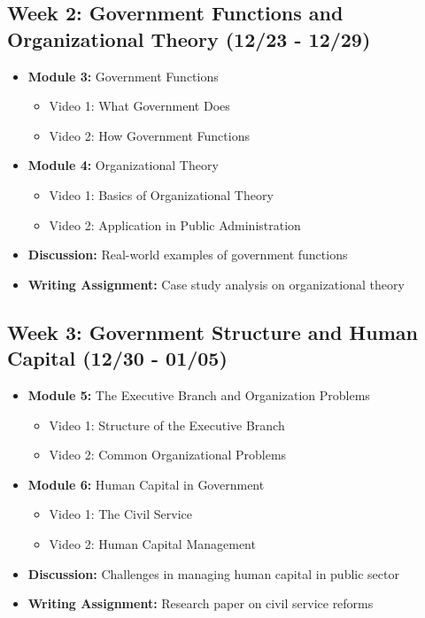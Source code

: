 \documentclass[12pt, letterpaper]{article}
\begin{document}
\subsection*{Week 2: Government Functions and Organizational Theory (12/23 - 12/29)}
\begin{itemize}
    \item \textbf{Module 3:} Government Functions
        \begin{itemize}
            \item Video 1: What Government Does
            \item Video 2: How Government Functions
        \end{itemize}
    \item \textbf{Module 4:} Organizational Theory
        \begin{itemize}
            \item Video 1: Basics of Organizational Theory
            \item Video 2: Application in Public Administration
        \end{itemize}
    \item \textbf{Discussion:} Real-world examples of government functions
    \item \textbf{Writing Assignment:} Case study analysis on organizational theory
\end{itemize}

\subsection*{Week 3: Government Structure and Human Capital (12/30 - 01/05)}
\begin{itemize}
    \item \textbf{Module 5:} The Executive Branch and Organization Problems
        \begin{itemize}
            \item Video 1: Structure of the Executive Branch
            \item Video 2: Common Organizational Problems
        \end{itemize}
    \item \textbf{Module 6:} Human Capital in Government
        \begin{itemize}
            \item Video 1: The Civil Service
            \item Video 2: Human Capital Management
        \end{itemize}
    \item \textbf{Discussion:} Challenges in managing human capital in public sector
    \item \textbf{Writing Assignment:} Research paper on civil service reforms
\end{itemize}
\end{document}
